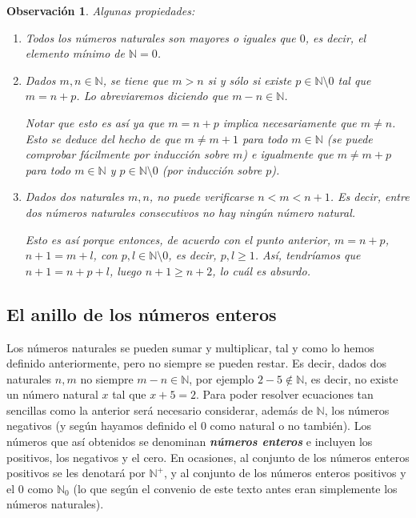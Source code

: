 \documentclass[12pt]{article}
\newtheorem{observation}{Observación}[theorem]
\begin{document}
\begin{observation}Algunas propiedades:
\begin{enumerate}
\item Todos los números naturales son mayores o iguales que $0$, es decir, el elemento mínimo de $\mathbb{N} = 0$.
\item Dados $m,n \in \mathbb{N}$, se tiene que $m > n$ si y sólo si existe $p \in \mathbb{N} \setminus 0$ tal que $m = n+p$. Lo abreviaremos diciendo que $m-n \in \mathbb{N}$.

Notar que esto es así ya que $m = n+p$ implica necesariamente que $m \neq n$. Esto se deduce del hecho de que $m \neq m+1$ para todo $m \in \mathbb{N}$ (se puede comprobar fácilmente por inducción sobre $m$) e igualmente que $m \neq m +p$ para todo $m \in \mathbb{N}$ y $p \in \mathbb{N}\setminus 0$ (por inducción sobre $p$).
\item Dados dos naturales $m,n$, no puede verificarse $n < m < n+1$. Es decir, entre dos números naturales consecutivos no hay ningún número natural.

Esto es así porque entonces, de acuerdo con el punto anterior, $m = n+p$, $n+1 = m+l$, con $p, l \in \mathbb{N}\setminus 0$, es decir, $p,l \geq 1$. Así, tendríamos que $n+1 = n+p +l$, luego $n+1 \geq n+2$, lo cuál es absurdo.
\end{enumerate}
\end{observation}

\subsection{El anillo de los números enteros}

Los números naturales se pueden sumar y multiplicar, tal y como lo hemos definido anteriormente, pero no siempre se pueden restar. Es decir, dados dos naturales $n,m$ no siempre $m-n \in \mathbb{N}$, por ejemplo $2-5 \notin \mathbb{N}$, es decir, no existe un número natural $x$ tal que $x+5=2$. Para poder resolver ecuaciones tan sencillas como la anterior será necesario considerar, además de $\mathbb{N}$, los números negativos (y según hayamos definido el $0$ como natural o no también). Los números que así obtenidos se denominan \textbf{\textit{números enteros}} e incluyen los positivos, los negativos y el cero. En ocasiones, al conjunto de los números enteros positivos se les denotará por $\mathbb{N}^+$, y al conjunto de los números enteros positivos y el $0$ como $\mathbb{N}_0$ (lo que según el convenio de este texto antes eran simplemente los números naturales).
\end{document}
